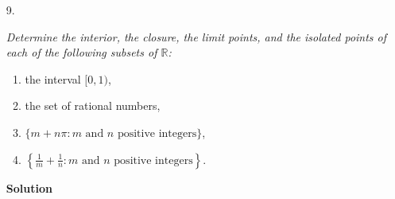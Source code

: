 \documentclass{article}
\begin{document}
\begin{enumerate}
\begin{itemize}
{\bf Solution}

Suppose that there exists some sequence \(\{E_n\}_{n = 1}^{\infty}\) of open subsets of \(\mathbb{R}\) such that \(\bigcap_{n = 1}^{\infty} E_n = \mathbb{Q}\).  Then \(\left( \bigcap_{n = 1}^{\infty} E_n \right) \cap \left( \bigcap_{r \in \mathbb{Q}} \mathbb{R} \backslash r \right) = \emptyset\), which is not dense in \(\mathbb{R}\).  Each of the sets in the intersection is open, hence, by Theorem 2.6 (Baire Category Theorem), one of them is not dense in \(\mathbb{R}\).  Each \(\mathbb{R} \backslash r\) is dense in \(\mathbb{R}\) for \(r \in \mathbb{Q}\), hence one of the \(E_n\)'s is not dense in \(\mathbb{R}\), i.e., there exists an open interval \(I \subset \mathbb{R}\) not in one of the \(E_n\)'s.  But then \(\bigcap_n E_n\) would not contain \(I\) either, and this contradicts the fact that \(\bigcap_n E_n = \mathbb{Q}\) is dense in \(\mathbb{R}\).  Therefore, the set of rational numbers cannot be expressed as the intersection of a sequence of open subsets of \(\mathbb{R}\).



\item[9.] {\em Determine the interior, the closure, the limit points, and the isolated points of each of the following subsets of \(\mathbb{R}\):
\begin{enumerate}
\item the interval \([0,1)\),
\item the set of rational numbers,
\item \(\{m + n \pi : m \text{ and } n \text{ positive integers}\}\),
\item \(\left\{ \frac{1}{m} + \frac{1}{n} : m \text{ and } n \text{ positive integers} \right\}\).
\end{enumerate}}

{\bf Solution}


\end{itemize}
\end{enumerate}
\end{document}

